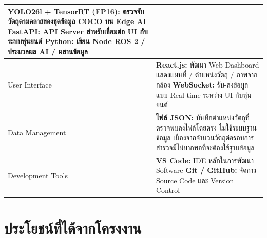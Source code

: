 \documentclass[a4paper,12pt]{report}
\begin{document}
\begin{table}[H]
\begin{tabularx}{\textwidth}{|>{\raggedright\arraybackslash}p{3.2cm}|X|}
\textbf{YOLO26l + TensorRT (FP16):}
ตรวจจับวัตถุตามคลาสของชุดข้อมูล COCO บน Edge AI \newline
\textbf{FastAPI:} API Server สำหรับเชื่อมต่อ UI กับระบบหุ่นยนต์ \newline
\textbf{Python:} เขียน Node ROS 2 / ประมวลผล AI / ผสานข้อมูล \\
\hline
User Interface &
\textbf{React.js:} พัฒนา Web Dashboard แสดงแผนที่ / ตำแหน่งวัตถุ / ภาพจากกล้อง \newline
\textbf{WebSocket:} รับ-ส่งข้อมูลแบบ Real-time ระหว่าง UI กับหุ่นยนต์ \\
\hline
Data Management &
\textbf{ไฟล์ JSON:} บันทึกตำแหน่งวัตถุที่ตรวจพบลงไฟล์โดยตรง ไม่ใช้ระบบฐานข้อมูล \newline
เนื่องจากจำนวนวัตถุต่อรอบการสำรวจมีไม่มากพอที่จะต้องใช้ฐานข้อมูล \\
\hline
Development Tools &
\textbf{VS Code:} IDE หลักในการพัฒนา Software \newline
\textbf{Git / GitHub:} จัดการ Source Code และ Version Control \\
\hline
\end{tabularx}
\end{table}

\clearpage
\section{ประโยชน์ที่ได้จากโครงงาน}
\end{document}
